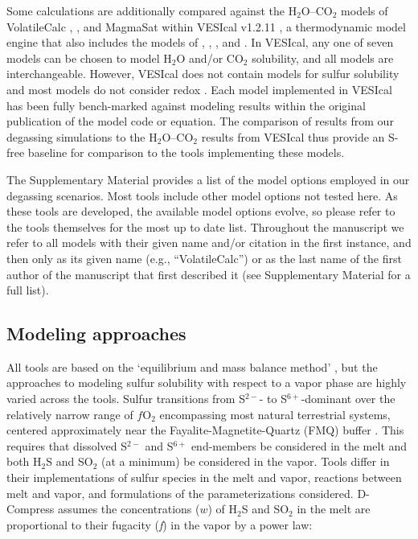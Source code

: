 \documentclass[draft, english]{volcanica-template}
\begin{document}
Some calculations are additionally compared against the H$_2$O–CO$_2$ models of VolatileCalc \parencite[][``VolatileCalc'' or ``VC'']{Newman2002}, \textcite[][``IM'']{IaconoMarziano2012}, and MagmaSat \parencite[][``MagmaSat'']{GhiorsoGualda2015} within VESIcal v1.2.11 \parencite{Iacovino2021}, a thermodynamic model engine that also includes the models of \textcite{Moore1998}, \textcite{liu2005}, \textcite{Shishkina2014}, and \textcite{allison2019}. In VESIcal, any one of seven models can be chosen to model H$_2$O and/or CO$_2$ solubility, and all models are interchangeable. However, VESIcal does not contain models for sulfur solubility and most models do not consider redox \parencite[although MagmaSat accepts melt Fe$^{3+}$/Fe$_T$ as an input;][]{WieserVESIcal2022}. Each model implemented in VESIcal has been fully bench-marked against modeling results within the original publication of the model code or equation. The comparison of results from our degassing simulations to the H$_2$O–CO$_2$ results from VESIcal thus provide an S-free baseline for comparison to the tools implementing these models.

The Supplementary Material provides a list of the model options employed in our degassing scenarios. Most tools include other model options not tested here. As these tools are developed, the available model options evolve, so please refer to the tools themselves for the most up to date list. Throughout the manuscript we refer to all models with their given name and/or citation in the first instance, and then only as its given name (e.g., ``VolatileCalc'') or as the last name of the first author of the manuscript that first described it (see Supplementary Material for a full list). 

\subsection{Modeling approaches}
\label{sec:modelingapproaches}

All tools are based on the `equilibrium and mass balance method' \parencite{holloway1987igneous}, but the approaches to modeling sulfur solubility with respect to a vapor phase are highly varied across the tools. Sulfur transitions from S$^{2-}$- to S$^{6+}$-dominant over the relatively narrow range of $f$O$_2$ encompassing most natural terrestrial systems, centered approximately near the Fayalite-Magnetite-Quartz (FMQ) buffer \parencite{jugo2005,wallace1994s,carroll1988sulfur}. This requires that dissolved S$^{2-}$ and S$^{6+}$ end-members be considered in the melt and both H$_2$S and SO$_2$ (at a minimum) be considered in the vapor. Tools differ in their implementations of sulfur species in the melt and vapor, reactions between melt and vapor, and formulations of the parameterizations considered. D-Compress assumes the concentrations ($w$) of H$_2$S and SO$_2$ in the melt are proportional to their fugacity (\textit{f}) in the vapor by a power law: 
\end{document}
